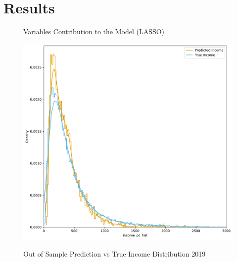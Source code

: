 \section{Results}


\begin{figure}[H]
    \centering
    \caption{Variables Contribution to the Model (LASSO)}
    \label{fig:enter-label}
\end{figure}




\begin{figure}[H]
    \centering
    \caption{Out of Sample Prediction vs True Income Distribution 2019}
    \includegraphics[width=1\textwidth]{../figures/fig1_prediction_vs_true_income_distribution_lasso_training_weighted.pdf}
    \label{fig:enter-label}
\end{figure}


